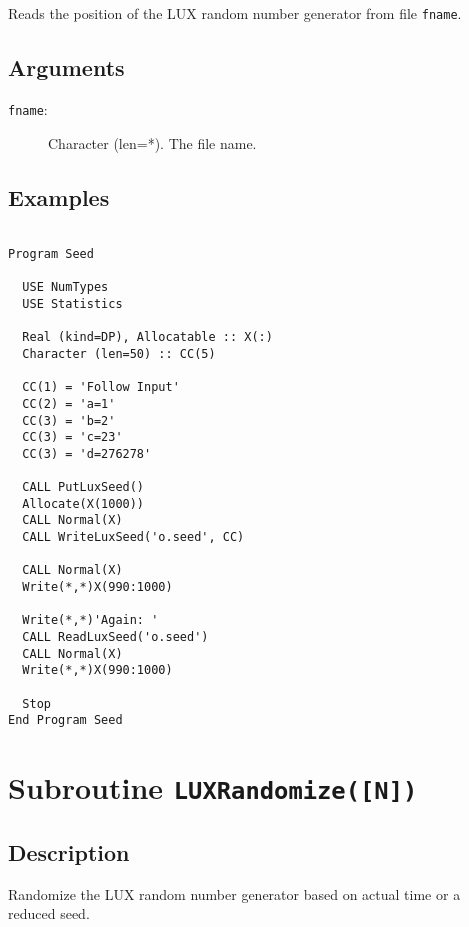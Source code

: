 Reads the position of the LUX random number generator from file
\texttt{fname}.

\subsection{Arguments}

\begin{description}
\item[\texttt{fname}:] Character (len=*). The file name.
\end{description}

\subsection{Examples}

\begin{lstlisting}[emph=ReadLuxSeed,
                   emphstyle=\color{blue},
                   frame=trBL,
                   caption=Using a previously saved point in the generating process.,
                   label=readluxseed]

Program Seed

  USE NumTypes
  USE Statistics

  Real (kind=DP), Allocatable :: X(:)
  Character (len=50) :: CC(5)

  CC(1) = 'Follow Input'
  CC(2) = 'a=1'
  CC(3) = 'b=2'
  CC(3) = 'c=23'
  CC(3) = 'd=276278'

  CALL PutLuxSeed()
  Allocate(X(1000))
  CALL Normal(X)
  CALL WriteLuxSeed('o.seed', CC)

  CALL Normal(X)
  Write(*,*)X(990:1000)

  Write(*,*)'Again: '
  CALL ReadLuxSeed('o.seed')
  CALL Normal(X)
  Write(*,*)X(990:1000)

  Stop
End Program Seed
\end{lstlisting}

\section{Subroutine \texttt{LUXRandomize([N])}}

\subsection{Description}

Randomize the LUX random number generator based on actual time or a
reduced seed. 

